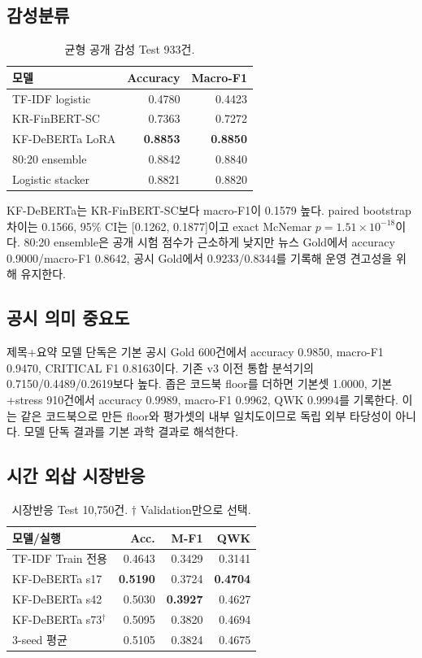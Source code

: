 \documentclass[10pt,a4paper,twocolumn]{article}
\begin{document}
\subsection{감성분류}

\begin{table}[t]
\centering
\small
\begin{tabular}{lrr}
\toprule
모델 & Accuracy & Macro-F1 \\
\midrule
TF-IDF logistic & 0.4780 & 0.4423 \\
KR-FinBERT-SC & 0.7363 & 0.7272 \\
KF-DeBERTa LoRA & \textbf{0.8853} & \textbf{0.8850} \\
80:20 ensemble & 0.8842 & 0.8840 \\
Logistic stacker & 0.8821 & 0.8820 \\
\bottomrule
\end{tabular}
\caption{균형 공개 감성 Test 933건.}
\label{tab:sent-ko}
\end{table}

KF-DeBERTa는 KR-FinBERT-SC보다 macro-F1이 0.1579 높다. paired bootstrap 차이는 0.1566, 95\% CI는 [0.1262, 0.1877]이고 exact McNemar $p=1.51\times10^{-18}$이다. 80:20 ensemble은 공개 시험 점수가 근소하게 낮지만 뉴스 Gold에서 accuracy 0.9000/macro-F1 0.8642, 공시 Gold에서 0.9233/0.8344를 기록해 운영 견고성을 위해 유지한다.

\subsection{공시 의미 중요도}

제목+요약 모델 단독은 기본 공시 Gold 600건에서 accuracy 0.9850, macro-F1 0.9470, CRITICAL F1 0.8163이다. 기존 v3 이전 통합 분석기의 0.7150/0.4489/0.2619보다 높다. 좁은 코드북 floor를 더하면 기본셋 1.0000, 기본+stress 910건에서 accuracy 0.9989, macro-F1 0.9962, QWK 0.9994를 기록한다. 이는 같은 코드북으로 만든 floor와 평가셋의 내부 일치도이므로 독립 외부 타당성이 아니다. 모델 단독 결과를 기본 과학 결과로 해석한다.

\subsection{시간 외삽 시장반응}

\begin{table}[t]
\centering
\small
\begin{tabular}{lrrr}
\toprule
모델/실행 & Acc. & M-F1 & QWK \\
\midrule
TF-IDF Train 전용 & 0.4643 & 0.3429 & 0.3141 \\
KF-DeBERTa s17 & \textbf{0.5190} & 0.3724 & \textbf{0.4704} \\
KF-DeBERTa s42 & 0.5030 & \textbf{0.3927} & 0.4627 \\
KF-DeBERTa s73$^\dagger$ & 0.5095 & 0.3820 & 0.4694 \\
3-seed 평균 & 0.5105 & 0.3824 & 0.4675 \\
\bottomrule
\end{tabular}
\caption{시장반응 Test 10,750건. $\dagger$ Validation만으로 선택.}
\label{tab:impact-ko}
\end{table}
\end{document}
